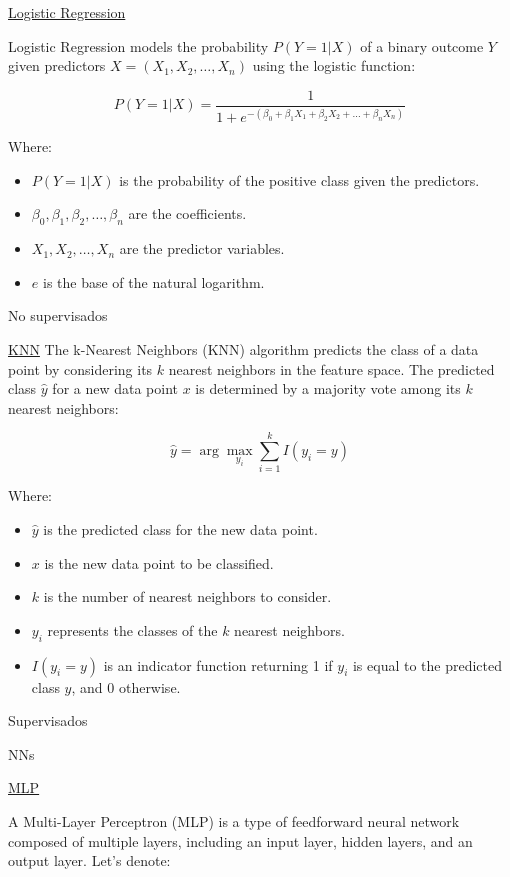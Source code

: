 \documentclass{uathesis-es}
\begin{document}
{\underline{Logistic Regression}

Logistic Regression models the probability $P(Y = 1|X)$ of a binary outcome $Y$ given predictors $X = (X_1, X_2, \ldots, X_n)$ using the logistic function:

\[
P(Y = 1|X) = \frac{1}{1 + e^{-(\beta_0 + \beta_1 X_1 + \beta_2 X_2 + \ldots + \beta_n X_n)}}
\]

Where:
\begin{itemize}
    \item $P(Y = 1|X)$ is the probability of the positive class given the predictors.
    \item $\beta_0, \beta_1, \beta_2, \ldots, \beta_n$ are the coefficients.
    \item $X_1, X_2, \ldots, X_n$ are the predictor variables.
    \item $e$ is the base of the natural logarithm.
\end{itemize}

No supervisados

\underline{KNN}
The k-Nearest Neighbors (KNN) algorithm predicts the class of a data point by considering its $k$ nearest neighbors in the feature space. The predicted class $\hat{y}$ for a new data point $x$ is determined by a majority vote among its $k$ nearest neighbors:

\[
\hat{y} = \arg\max_{y_i} \sum_{i=1}^{k} I(y_i = y)
\]

Where:
\begin{itemize}
    \item $\hat{y}$ is the predicted class for the new data point.
    \item $x$ is the new data point to be classified.
    \item $k$ is the number of nearest neighbors to consider.
    \item $y_i$ represents the classes of the $k$ nearest neighbors.
    \item $I(y_i = y)$ is an indicator function returning 1 if $y_i$ is equal to the predicted class $y$, and 0 otherwise.
\end{itemize}

Supervisados

NNs

\underline{MLP}

A Multi-Layer Perceptron (MLP) is a type of feedforward neural network composed of multiple layers, including an input layer, hidden layers, and an output layer. Let's denote:

}
\end{document}
